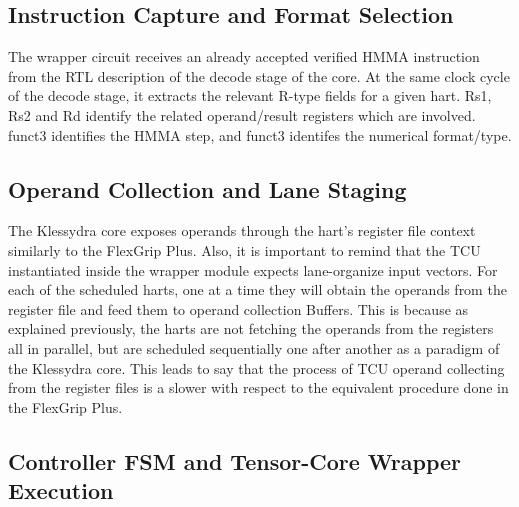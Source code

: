 \subsection{Instruction Capture and Format Selection}

The wrapper circuit receives an already accepted verified HMMA instruction from the RTL description of the decode stage of the core. At the same clock cycle of the decode stage, it extracts the relevant R-type fields for a given hart. Rs1, Rs2 and Rd identify the related operand/result registers which are involved. funct3 identifies the HMMA step, and funct3 identifes the numerical format/type. 

\subsection{Operand Collection and Lane Staging}

The Klessydra core exposes operands through the hart's register file context similarly to the FlexGrip Plus. Also, it is important to remind that the TCU instantiated inside the wrapper module expects lane-organize input vectors. For each of the scheduled harts, one at a time they will obtain the operands from the register file and feed them to operand collection Buffers. This is because as explained previously, the harts are not fetching the operands from the registers all in parallel, but are scheduled sequentially one after another as a paradigm of the Klessydra core. This leads to say that the process of TCU operand collecting from the register files is a slower with respect to the equivalent procedure done in the FlexGrip Plus. 

\subsection{Controller FSM and Tensor-Core Wrapper Execution}

